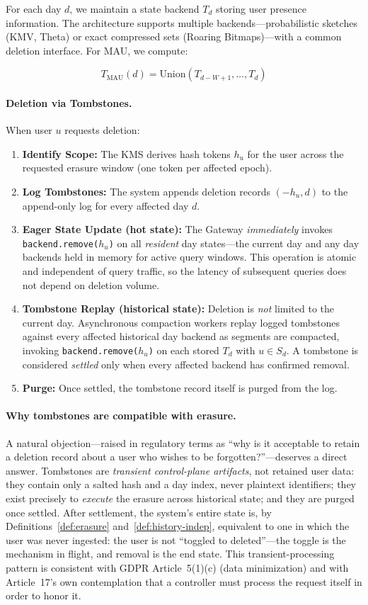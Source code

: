 \documentclass[sigconf,anonymous,review]{acmart}
\begin{document}
For each day $d$, we maintain a state backend $T_d$ storing user presence information. The architecture supports multiple backends---probabilistic sketches (KMV, Theta) or exact compressed sets (Roaring Bitmaps)---with a common deletion interface. For MAU, we compute:

\[
    T_{\text{MAU}}(d) = \text{Union}(T_{d-W+1}, \ldots, T_d)
\]

\paragraph{Deletion via Tombstones.} When user $u$ requests deletion:
\begin{enumerate}
    \item \textbf{Identify Scope:} The KMS derives hash tokens $h_u$ for the user across the requested erasure window (one token per affected epoch).
    \item \textbf{Log Tombstones:} The system appends deletion records $(-h_u, d)$ to the append-only log for every affected day $d$.
    \item \textbf{Eager State Update (hot state):} The Gateway \textit{immediately} invokes \texttt{backend.remove($h_u$)} on all \emph{resident} day states---the current day and any day backends held in memory for active query windows. This operation is atomic and independent of query traffic, so the latency of subsequent queries does not depend on deletion volume.
    \item \textbf{Tombstone Replay (historical state):} Deletion is \emph{not} limited to the current day. Asynchronous compaction workers replay logged tombstones against every affected historical day backend as segments are compacted, invoking \texttt{backend.remove($h_u$)} on each stored $T_d$ with $u \in S_d$. A tombstone is considered \emph{settled} only when every affected backend has confirmed removal.
    \item \textbf{Purge:} Once settled, the tombstone record itself is purged from the log.
\end{enumerate}

\paragraph{Why tombstones are compatible with erasure.} A natural objection---raised in regulatory terms as ``why is it acceptable to retain a deletion record about a user who wishes to be forgotten?''---deserves a direct answer. Tombstones are \emph{transient control-plane artifacts}, not retained user data: they contain only a salted hash and a day index, never plaintext identifiers; they exist precisely to \emph{execute} the erasure across historical state; and they are purged once settled. After settlement, the system's entire state is, by Definitions~\ref{def:erasure} and~\ref{def:history-indep}, equivalent to one in which the user was never ingested: the user is not ``toggled to deleted''---the toggle is the mechanism in flight, and removal is the end state. This transient-processing pattern is consistent with GDPR Article~5(1)(c) (data minimization) and with Article~17's own contemplation that a controller must process the request itself in order to honor it.
\end{document}
